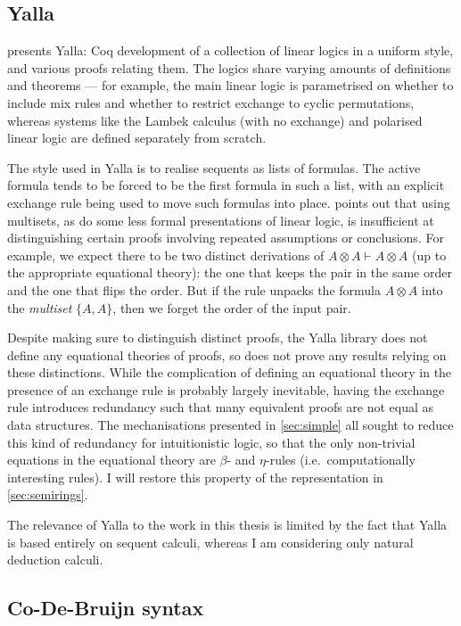 \subsection{Yalla}

 presents Yalla: Coq development of a collection of linear
logics in a uniform style, and various proofs relating them.
The logics share varying amounts of definitions and theorems --- for example,
the main linear logic is parametrised on whether to include mix rules and
whether to restrict exchange to cyclic permutations, whereas systems like the
Lambek calculus (with no exchange) and polarised linear logic are defined
separately from scratch.

The style used in Yalla is to realise sequents as lists of formulas.
The active formula tends to be forced to be the first formula in such a list,
with an explicit exchange rule being used to move such formulas into place.
 points out that using multisets, as do some less formal
presentations of linear logic, is insufficient at distinguishing certain proofs
involving repeated assumptions or conclusions.
For example, we expect there to be two distinct derivations of
$A \otimes A \vdash A \otimes A$ (up to the appropriate equational theory):
the one that keeps the pair in the same order and the one that flips the order.
But if the  rule unpacks the formula $A \otimes A$ into the
\emph{multiset} $\{A, A\}$, then we forget the order of the input pair.

Despite making sure to distinguish distinct proofs, the Yalla library does not
define any equational theories of proofs, so does not prove any results relying
on these distinctions.
While the complication of defining an equational theory in the presence of an
exchange rule is probably largely inevitable, having the exchange rule
introduces redundancy such that many equivalent proofs are not equal as data
structures.
The mechanisations presented in \cref{sec:simple} all sought to reduce this kind
of redundancy for intuitionistic logic, so that the only non-trivial equations
in the equational theory are $\beta$- and $\eta$-rules (i.e.\ computationally
interesting rules).
I will restore this property of the representation in \cref{sec:semirings}.

The relevance of Yalla to the work in this thesis is limited by the fact that
Yalla is based entirely on sequent calculi, whereas I am considering only
natural deduction calculi.

\subsection{Co-De-Bruijn syntax}


